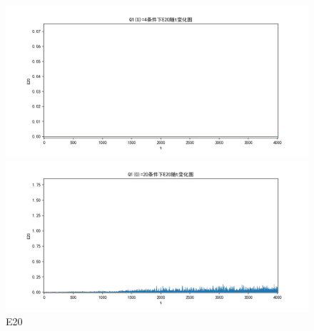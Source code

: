 \documentclass[10pt, a4paper]{article}
\begin{document}
    \begin{figure}[H]
        \begin{minipage}[t]{0.49\textwidth}
            \centering
            \includegraphics[width=\textwidth]{./q5_pics/cmp/E20.png}
        \end{minipage}
        \begin{minipage}[t]{0.49\textwidth}
            \centering
            \includegraphics[width=\textwidth]{./q5_pics/exp/E20.png}
        \end{minipage}
        \caption{E20}\label{fig:E20 in q5}
    \end{figure}
\end{document}
